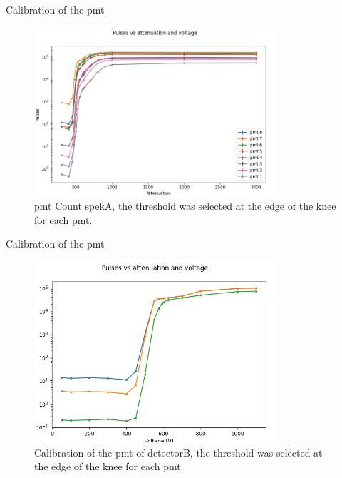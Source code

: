 \documentclass[8pt,a4paper]{beamer}
\begin{document}
\begin{frame}{Calibration of the pmt}

\begin{figure}[hbtp]
\caption{pmt Count spekA, the threshold was selected at the edge of the knee for each pmt.}
\centering
\includegraphics[width = 0.8\textwidth]{figures/Calibration.png}
\end{figure}

\end{frame}

\begin{frame}{Calibration of the pmt}

\begin{figure}[hbtp]
\centering
\includegraphics[width = 0.8\textwidth]{figures/CalibrationB.png}
\caption{Calibration of the pmt of detectorB, the threshold was selected at the edge of the knee for each pmt.}
\end{figure}

\end{frame}
\end{document}
